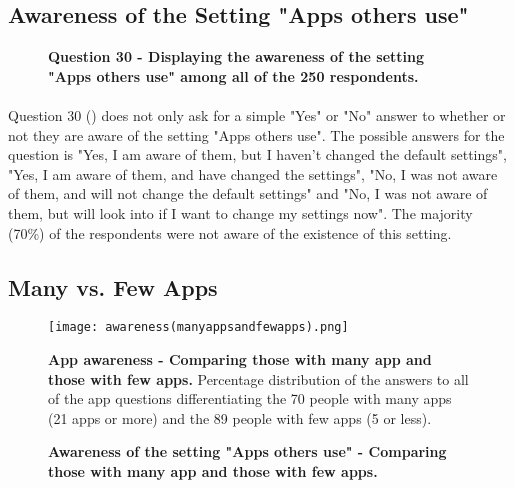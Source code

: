 \subsection{Awareness of the Setting "Apps others use"}

\begin{figure}[t]
\centering
{}
\caption[Question 30 - Displaying the awareness of the setting "Apps others use" among all of the 250 respondents]{\textbf{Question 30 - Displaying the awareness of the setting "Apps others use" among all of the 250 respondents.}} 
\label{fig:appsothersuse}
\end{figure}

\paragraph{}
Question 30 () does not only ask for a simple "Yes" or "No" answer to whether or not they are aware of the setting "Apps others use". The possible answers for the question is "Yes, I am aware of them, but I haven't changed the default settings", "Yes, I am aware of them, and have changed the settings", "No, I was not aware of them, and will not change the default settings" and "No, I was not aware of them, but will look into if I want to change my settings now". The majority (70\%) of the respondents were not aware of the existence of this setting. 


\subsection{Many vs. Few Apps}

\begin{figure}[t]
\centering
\texttt{[image: awareness(manyappsandfewapps).png]}
\caption[App awareness - Comparing those with many app and those with few apps]{\textbf{App awareness - Comparing those with many app and those with few apps.} Percentage distribution of the answers to all of the app questions differentiating the 70 people with many apps (21 apps or more) and the 89 people with few apps (5 or less).} 
\label{fig:manyappsandfewapps}
\end{figure}

\begin{figure}[h!]
\centering
{}
\caption[Awareness of the setting "Apps others use" - Comparing those with many app and those with few apps]{\textbf{Awareness of the setting "Apps others use" - Comparing those with many app and those with few apps.}} 
\label{fig:appsothersusemanyfew}
\end{figure}

